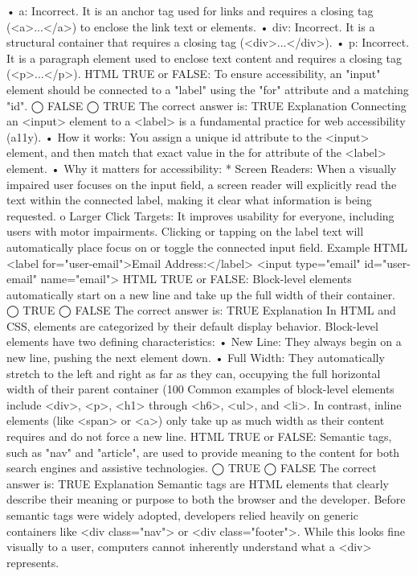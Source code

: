 •	a: Incorrect. It is an anchor tag used for links and requires a closing tag (<a>...</a>) to enclose the link text or elements.
•	div: Incorrect. It is a structural container that requires a closing tag (<div>...</div>).
•	p: Incorrect. It is a paragraph element used to enclose text content and requires a closing tag (<p>...</p>).
HTML
TRUE or FALSE: To ensure accessibility, an "input" element should be connected to a "label" using the "for" attribute and a matching "id".
◯ FALSE
◯ TRUE
The correct answer is:
TRUE
Explanation
Connecting an <input> element to a <label> is a fundamental practice for web accessibility (a11y).
•	How it works: You assign a unique id attribute to the <input> element, and then match that exact value in the for attribute of the <label> element.
•	Why it matters for accessibility: * Screen Readers: When a visually impaired user focuses on the input field, a screen reader will explicitly read the text within the connected label, making it clear what information is being requested.
o	Larger Click Targets: It improves usability for everyone, including users with motor impairments. Clicking or tapping on the label text will automatically place focus on or toggle the connected input field.
Example
HTML
<label for="user-email">Email Address:</label>
<input type="email" id="user-email" name="email">
HTML
TRUE or FALSE: Block-level elements automatically start on a new line and take up the full width of their container.
◯ TRUE
◯ FALSE
The correct answer is:
TRUE
Explanation
In HTML and CSS, elements are categorized by their default display behavior. Block-level elements have two defining characteristics:
•	New Line: They always begin on a new line, pushing the next element down.
•	Full Width: They automatically stretch to the left and right as far as they can, occupying the full horizontal width of their parent container (100%
Common examples of block-level elements include <div>, <p>, <h1> through <h6>, <ul>, and <li>.
In contrast, inline elements (like <span> or <a>) only take up as much width as their content requires and do not force a new line.
HTML
TRUE or FALSE: Semantic tags, such as "nav" and "article", are used to provide meaning to the content for both search engines and assistive technologies.
◯ TRUE
◯ FALSE
The correct answer is:
TRUE
Explanation
Semantic tags are HTML elements that clearly describe their meaning or purpose to both the browser and the developer.
Before semantic tags were widely adopted, developers relied heavily on generic containers like <div class="nav"> or <div class="footer">. While this looks fine visually to a user, computers cannot inherently understand what a <div> represents.
